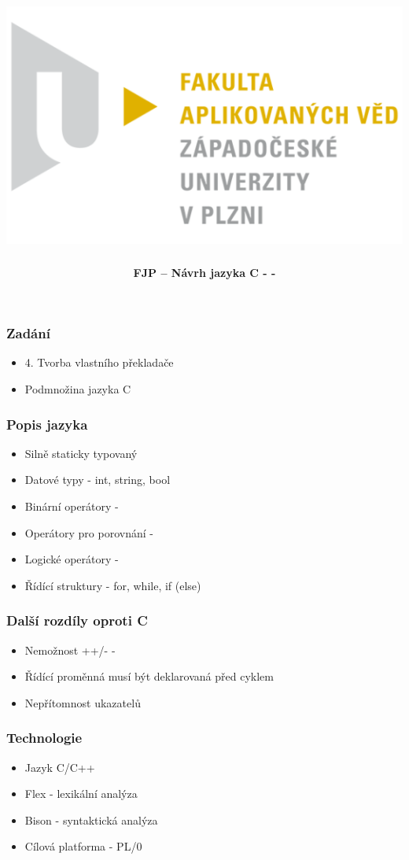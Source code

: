 \documentclass[xcolor=dvipsnames]{beamer}
\title[Západočeská univerzita v Plzni]{\includegraphics[width=\textwidth/4]{img/logo.png}}
\author[Jindřiška Reismüllerová \& Stanislav Král]{ \textbf{FJP -- Návrh jazyka C - -}}
\institute{}
\begin{document}
\begin{frame}
  \titlepage
\end{frame}

\begin{frame}
\frametitle{\textbf{Zadání}}
	\begin{itemize}
    		\item 4. Tvorba vlastního překladače
    		\item Podmnožina jazyka C
    
  	\end{itemize}
\end{frame}


\begin{frame}
\frametitle{\textbf{Popis jazyka}}
	\begin{itemize}
    		\item Silně staticky typovaný
    		\item Datové typy - int, string, bool
    		\item Binární operátory - \uv{+-*/}
    		\item Operátory pro porovnání - \uv{$<,  >,   ==,  <=,  >= ,  !=$}
    		\item Logické operátory - \uv{$||$, \&\&}
    		\item Řídící struktury - for, while, if (else)
  	\end{itemize}
\end{frame}

\begin{frame}
\frametitle{\textbf{Další rozdíly oproti C}}
	\begin{itemize}
    		\item Nemožnost ++/- -
    		\item Řídící proměnná musí být deklarovaná před cyklem
    		\item Nepřítomnost ukazatelů
  	\end{itemize}
\end{frame}

\begin{frame}
\frametitle{\textbf{Technologie}}
	\begin{itemize}
    		\item Jazyk C/C++
    		\item Flex - lexikální analýza
    		\item Bison - syntaktická analýza
    		\item Cílová platforma -  PL/0
  	\end{itemize}
\end{frame}
\end{document}
